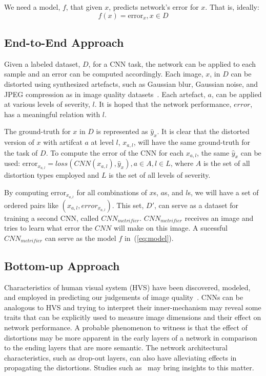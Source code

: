 \documentclass{article}
\begin{document}
We need a model, $f$, that given $x$, predicts network's error for $x$. That is, ideally:
\begin{equation}
	\label{eq:model}
	f(x) = \text{error}_x, x\in D
\end{equation}
\subsection{End-to-End Approach} \label{sec:end_to_end}
Given a labeled dataset, $D$, for a CNN task, the network can be applied to each sample and an error can be computed accordingly. Each image, $x$, in $D$ can be distorted using synthesized artefacts, such as Gaussian blur, Gaussian noise, and JPEG compression as in image quality datasets~\cite{sheikh2005live}. Each artefact, $a$, can be applied at various levels of severity, $l$. It is hoped that the network performance, $error$, has a meaningful relation with $l$.

The ground-truth for $x$ in $D$ is represented as $\hat{y}_x$. It is clear that the distorted version of $x$ with artifcat $a$ at level $l$, $x_{a, l}$, will have the same ground-truth for the task of $D$. To compute the error of the CNN for each $x_{a,l}$, the same $\hat{y}_x$ can be used: $\text{error}_{x_{a, l}} = loss(CNN(x_{a,l}), \hat{y}_x), a\in A, l\in L$, where $A$ is the set of all distortion types employed and $L$ is the set of all levels of severity.

By computing $\text{error}_{x_{a, l}}$ for all combinations of $x$s, $a$s, and $l$s, we will have a set of ordered pairs like $(x_{a, l}, error_{x_{a, l}})$. This set, $D\prime$, can serve as a dataset for training a second CNN, called $CNN_{metrifier}$. $CNN_{metrifier}$ receives an image and tries to learn what error the $CNN$ will make on this image. A sucessful $CNN_{metrifier}$ can serve as the model $f$ in~(\ref{eq:model}).
\subsection{Bottom-up Approach} \label{sec:bottom_up}
Characteristics of human visual system (HVS) have been discovered, modeled, and employed in predicting our judgements of image quality~\cite{zhai2020perceptual, fry2018bridging}. CNNs can be analogous to HVS and trying to interpret their inner-mechanism may reveal some traits that can be explicitly used to measure image dimensions and their effect on network performance. A probable phenomenon to witness is that the effect of distortions may be more apparent in the early layers of a network in comparison to the ending layers that are more semantic. The network architectural characteristics, such as drop-out layers, can also have alleviating effects in propagating the distortions. Studies such as~\cite{kumar2022surprising,blau2018perception,berardino2017eigen,zhang2018unreasonable, amir2021understanding} may bring insights to this matter.
\end{document}
